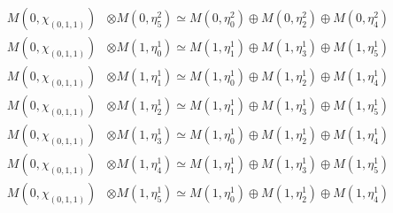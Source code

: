 \begin{align*}
M(0,\chi_{(0,1,1)}) &\otimes M(0,\eta^{2}_{5}) \simeq M(0,\eta^{2}_{0}) \oplus M(0,\eta^{2}_{2}) \oplus M(0,\eta^{2}_{4}) \\
M(0,\chi_{(0,1,1)}) &\otimes M(1,\eta^{1}_{0}) \simeq M(1,\eta^{1}_{1}) \oplus M(1,\eta^{1}_{3}) \oplus M(1,\eta^{1}_{5}) \\
M(0,\chi_{(0,1,1)}) &\otimes M(1,\eta^{1}_{1}) \simeq M(1,\eta^{1}_{0}) \oplus M(1,\eta^{1}_{2}) \oplus M(1,\eta^{1}_{4}) \\
M(0,\chi_{(0,1,1)}) &\otimes M(1,\eta^{1}_{2}) \simeq M(1,\eta^{1}_{1}) \oplus M(1,\eta^{1}_{3}) \oplus M(1,\eta^{1}_{5}) \\
M(0,\chi_{(0,1,1)}) &\otimes M(1,\eta^{1}_{3}) \simeq M(1,\eta^{1}_{0}) \oplus M(1,\eta^{1}_{2}) \oplus M(1,\eta^{1}_{4}) \\
M(0,\chi_{(0,1,1)}) &\otimes M(1,\eta^{1}_{4}) \simeq M(1,\eta^{1}_{1}) \oplus M(1,\eta^{1}_{3}) \oplus M(1,\eta^{1}_{5}) \\
M(0,\chi_{(0,1,1)}) &\otimes M(1,\eta^{1}_{5}) \simeq M(1,\eta^{1}_{0}) \oplus M(1,\eta^{1}_{2}) \oplus M(1,\eta^{1}_{4}) \\
\end{align*}


